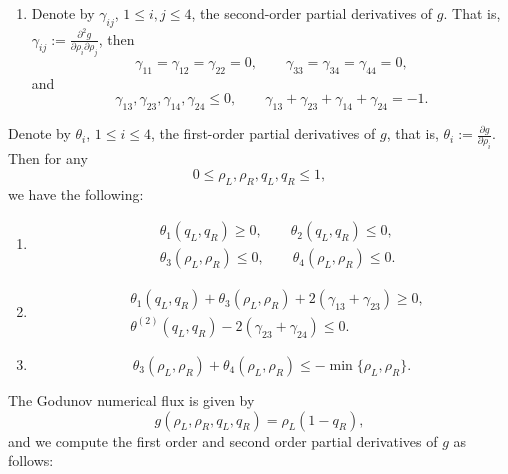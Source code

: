 \begin{assumption}
    \leavevmode
    \begin{enumerate}
        \item Denote by $\gamma_{ij}$, $1 \le i,j \le 4$, the second-order partial derivatives of $g$. That is, $\gamma_{ij}:= \frac{\partial^2 g}{\partial \rho_i \partial \rho_j }$, then
              \[
                  \gamma_{11}=\gamma_{12}=\gamma_{22}=0,
                  \qquad
                  \gamma_{33}=\gamma_{34}=\gamma_{44}=0,
              \]
              and
              \[
                  \gamma_{13},\gamma_{23},\gamma_{14},\gamma_{24} \le 0,
                  \qquad
                  \gamma_{13}+\gamma_{23}+\gamma_{14}+\gamma_{24} = -1.
              \]
    \end{enumerate}
\end{assumption}
\begin{assumption}
    Denote by $\theta_i$, $1 \le i \le 4$, the first-order partial derivatives of $g$, that is, $\theta_i:= \frac{\partial g}{\partial \rho_i}$. Then for any
    \[
        0 \le \rho_L,\rho_R,q_L,q_R \le 1,
    \]
    we have the following:
    \begin{enumerate}
        \item
              \begin{align*}
                   & \theta_1(q_L,q_R) \ge 0,
                  \qquad
                  \theta_2(q_L,q_R) \le 0,          \\
                   & \theta_3(\rho_L,\rho_R) \le 0,
                  \qquad
                  \theta_4(\rho_L,\rho_R) \le 0.
              \end{align*}

        \item
              \begin{align*}
                   & \theta_1(q_L,q_R)+\theta_3(\rho_L,\rho_R)
                  +2(\gamma_{13}+\gamma_{23}) \ge 0,                         \\
                   & \theta^{(2)}(q_L,q_R)-2(\gamma_{23}+\gamma_{24}) \le 0.
              \end{align*}

        \item
              \[
                  \theta_3(\rho_L,\rho_R)+\theta_4(\rho_L,\rho_R)
                  \le -\min\{\rho_L,\rho_R\}.
              \]
    \end{enumerate}
\end{assumption}
The Godunov numerical flux is given by
\[g(\rho_L,\rho_R,q_L,q_R)= \rho_L (1-q_R),\] and we compute the first order and second order partial derivatives of $g$ as follows:

